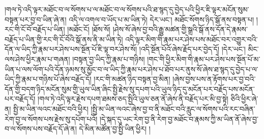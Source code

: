།གལ་ཏེ་འདི་ལྟར་མཐོང་བ་ལ་སོགས་པ་ལ་མཐོང་བ་ལ་སོགས་པའི་ཐ་སྙད་དུ་བྱེད་པའི་ཕྱིར་ཇི་ལྟར་མངོན་སུམ་བསྟན་པར་བྱ་བ་ཡིན་ཞེ་ན། འདི་ལ་འགལ་བ་ཡོད་པ་མ་ཡིན་ཏེ། དེར་ཡང་། མཐོང་སོགས་ཉིད་སྒོ་ནས་བསྟན་པ། །རང་གི་ངོ་བོ་བརྗོད་པ་ཡིན། །མཐོང་ངོ། །ཐོས་སོ། །ཤེས་སོ་ཞེས་བྱ་བའི་རྒྱུ་མཚན་གྱི་སྒྲའི་སྒོ་ནས་དོན་དེ་རྣམས་བརྗོད་པ་ཡིན་གྱི་རང་གི་ངོ་བོའི་སྒོ་ནས་ནི་མ་ཡིན་ཏེ། འདི་ལྟར་མིག་གི་རྣམ་པར་ཤེས་པས་མཐོང་བར་འགྱུར་བའི་དོན་ལ་ཡིད་ཀྱི་རྣམ་པར་ཤེས་པས་སྔོན་པོ་ཇི་ལྟ་བར་ཤེས་སོ། །འདི་སྔོན་པོའོ་ཞེས་རྗོད་པར་བྱེད་དོ། །དེར་ཡང་། མིང་ལས་ཤེས་ཕྱིར་རྣམ་པ་གཞན། །བསྟན་བྱ་ཡིད་ཀྱི་རྣམ་པ་གཉིས། །གང་གི་ཕྱིར་མིག་གི་རྣམ་པར་ཤེས་པས་སྔོན་པོ་མ་ཡིན་པ་ལས་ལོག་པའི་དོན་ཉམས་སུ་མྱོང་བ་ལ་ཡིད་ཀྱི་རྣམ་པར་ཤེས་པ་ཐོབ་པར་ནུས་སོ་ཞེས་ཐ་སྙད་དུ་བྱེད་པ་ལ་ཡིད་ཀྱི་རྣམ་པ་གཉིས་པོ་ཞེས་བརྗོད་དོ། །རང་གི་མཚན་ཉིད་བསྟན་བྱ་མིན། །ཞེས་བྱས་པས་ན་རྟོགས་པར་བྱ་བའི་དོན་གྱི་བདག་ཉིད་མངོན་སུམ་གྱི་ཡུལ་ཡིན་ཞིང་སྤྱི་རྗེས་སུ་དཔག་པའི་ཡུལ་ཉིད་དུ་མངོན་པར་བརྗོད་པས་མངོན་པར་བརྗོད་དོ། །གལ་ཏེ་འདི་ལྟར་རྗེས་དཔག་ཐམས་ཅད་སྤྱིའི་ཡུལ་ཅན་ནོ་ཞེས་ནི་བརྗོད་པར་མི་བྱ་སྟེ། ཅིའི་ཕྱིར་ཞེ་ན། སྤྱི་མ་ཡིན་ལའང་མཐོང་བའི་ཕྱིར། །སྤྱི་མ་ཡིན་ལའང་ཞེས་བྱ་བ་ནི་མཐོང་བའི་རླུང་ལ་སོགས་པའི་རང་བཞིན་རེག་བྱ་ལ་སོགས་པས་རྗེས་སུ་དཔོག་པའོ། །དེ་སྐད་དུ་ཡང་རེག་བྱ་ནི་རེག་བྱ་མཐོང་བ་རྣམས་ཀྱི་མ་ཡིན་ནོ་ཞེས་བྱ་བ་ལ་སོགས་པས་བརྗོད་དོ་ཞེ་ན། དེ་མིན་མཚོན་བྱ་སྤྱི་ཡིན་ཕྱིར། །
